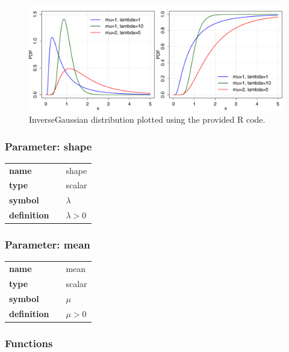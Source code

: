 \begin{figure}[ht!]
\centering
  \includegraphics[width=140mm]{pics/InverseGaussian.pdf}
 \caption{InverseGaussian distribution plotted using the provided R code.}
 \label{fig:InverseGaussian}
\end{figure}

\subsubsection*{Parameter: shape}

\noindent\begin{tabular}{p{2cm}cl}
\textbf{name} & & shape \\
\textbf{type} & & scalar \\
\textbf{symbol} & & $\lambda$  \\
\textbf{definition} & & $\lambda > 0$
\end{tabular}
\subsubsection*{Parameter: mean}

\noindent\begin{tabular}{p{2cm}cl}
\textbf{name} & & mean \\
\textbf{type} & & scalar \\
\textbf{symbol} & & $\mu$  \\
\textbf{definition} & & $\mu > 0$
\end{tabular}
\subsubsection*{Functions}

